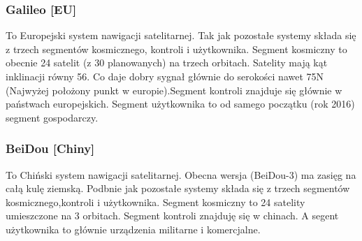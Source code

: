\documentclass{article}
\begin{document}
    \subsubsection{Galileo [EU]}
    \sloppy
    To Europejski system nawigacji satelitarnej. Tak jak pozostałe systemy składa się z trzech segmentów kosmicznego, 
    kontroli i użytkownika. Segment kosmiczny to obecnie 24 satelit (z 30 planowanych) na trzech orbitach. Satelity 
    mają kąt inklinacji równy 56\degree. Co daje dobry sygnał głównie do serokości nawet 75\degree N (Najwyżej 
    położony punkt w europie).Segment kontroli znajduje się głównie w państwach europejskich. Segment użytkownika to 
    od samego początku (rok 2016) segment gospodarczy. 
    \subsubsection{BeiDou [Chiny]}
    \sloppy
    To Chiński system nawigacji satelitarnej. Obecna wersja (BeiDou-3) ma zasięg na całą kulę ziemską. Podbnie jak 
    pozostałe systemy składa się z trzech segmentów kosmicznego,kontroli i użytkownika. Segment kosmiczny to 24 
    satelity umieszczone na 3 orbitach. Segment kontroli znajduję się w chinach. A segent użytkownika to głównie 
    urządzenia militarne i komercjalne.
\end{document}
